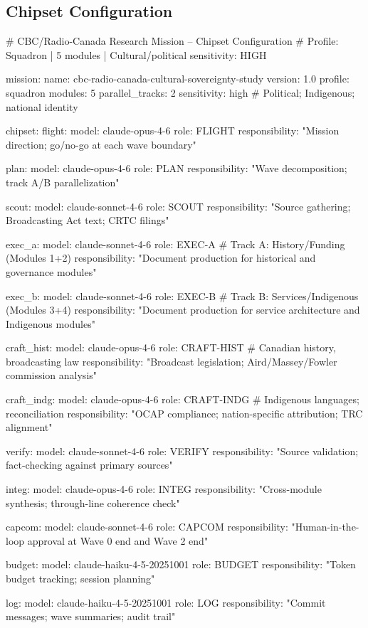 \documentclass[11pt,letterpaper]{article}
\begin{document}
\subsection{Chipset Configuration}

\begin{asciibox}
# CBC/Radio-Canada Research Mission -- Chipset Configuration
# Profile: Squadron | 5 modules | Cultural/political sensitivity: HIGH

mission:
  name: cbc-radio-canada-cultural-sovereignty-study
  version: 1.0
  profile: squadron
  modules: 5
  parallel_tracks: 2
  sensitivity: high  # Political; Indigenous; national identity

chipset:
  flight:
    model: claude-opus-4-6
    role: FLIGHT
    responsibility: "Mission direction; go/no-go at each wave boundary"

  plan:
    model: claude-opus-4-6
    role: PLAN
    responsibility: "Wave decomposition; track A/B parallelization"

  scout:
    model: claude-sonnet-4-6
    role: SCOUT
    responsibility: "Source gathering; Broadcasting Act text; CRTC filings"

  exec_a:
    model: claude-sonnet-4-6
    role: EXEC-A  # Track A: History/Funding (Modules 1+2)
    responsibility: "Document production for historical and governance modules"

  exec_b:
    model: claude-sonnet-4-6
    role: EXEC-B  # Track B: Services/Indigenous (Modules 3+4)
    responsibility: "Document production for service architecture and Indigenous modules"

  craft_hist:
    model: claude-opus-4-6
    role: CRAFT-HIST  # Canadian history, broadcasting law
    responsibility: "Broadcast legislation; Aird/Massey/Fowler commission analysis"

  craft_indg:
    model: claude-opus-4-6
    role: CRAFT-INDG  # Indigenous languages; reconciliation
    responsibility: "OCAP compliance; nation-specific attribution; TRC alignment"

  verify:
    model: claude-sonnet-4-6
    role: VERIFY
    responsibility: "Source validation; fact-checking against primary sources"

  integ:
    model: claude-opus-4-6
    role: INTEG
    responsibility: "Cross-module synthesis; through-line coherence check"

  capcom:
    model: claude-sonnet-4-6
    role: CAPCOM
    responsibility: "Human-in-the-loop approval at Wave 0 end and Wave 2 end"

  budget:
    model: claude-haiku-4-5-20251001
    role: BUDGET
    responsibility: "Token budget tracking; session planning"

  log:
    model: claude-haiku-4-5-20251001
    role: LOG
    responsibility: "Commit messages; wave summaries; audit trail"
\end{asciibox}
\end{document}
